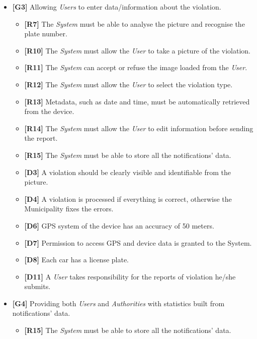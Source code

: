 \documentclass {article}
\begin{document}
\begin{itemize}
\begin{itemize}
   			 \item {\bf [D8]} Each car has a license plate.
   			 \item {\bf [D11]} A {\it User} takes responsibility for the reports of violation he/she submits.
			 \end{itemize}
			 \item {\bf [G3]} Allowing {\it Users} to enter data/information about the violation.
			 \begin{itemize}
			 \item {\bf [R7]} The {\it System} must be able to analyse the picture and recognise the plate number. 
			 \item {\bf [R10]} The {\it System} must allow the {\it User} to take a picture of the violation.
			 \item {\bf [R11]} The {\it System} can accept or refuse the image loaded from the {\it User}.
			 \item {\bf [R12]} The {\it System} must allow the {\it User} to select the violation type.
			 \item {\bf [R13]} Metadata, such as date and time, must be automatically retrieved from the device. 
			 \item {\bf [R14]} The {\it System} must allow the {\it User} to edit information before sending the report.
			 \item {\bf [R15]} The {\it System} must be able to store all the notifications' data.
			 \item {\bf [D3]} A violation should be clearly visible and identifiable from the picture.
			 \item {\bf [D4]} A violation is processed if everything is correct, otherwise the Municipality fixes the errors.
			 \item {\bf [D6]} GPS system of the device has an accuracy of 50 meters.
			 \item {\bf [D7]} Permission to access GPS and device data is granted to the System.
   			 \item {\bf [D8]} Each car has a license plate.
   			 \item {\bf [D11]} A {\it User} takes responsibility for the reports of violation he/she submits.
			 \end{itemize}
   			 \item {\bf [G4]} Providing both {\it Users} and {\it Authorities} with statistics built from notifications’ data.    	
   			 \begin{itemize}
   			 \item {\bf [R15]} The {\it System} must be able to store all the notifications' data.

\end{itemize}
\end{itemize}
\end{document}
